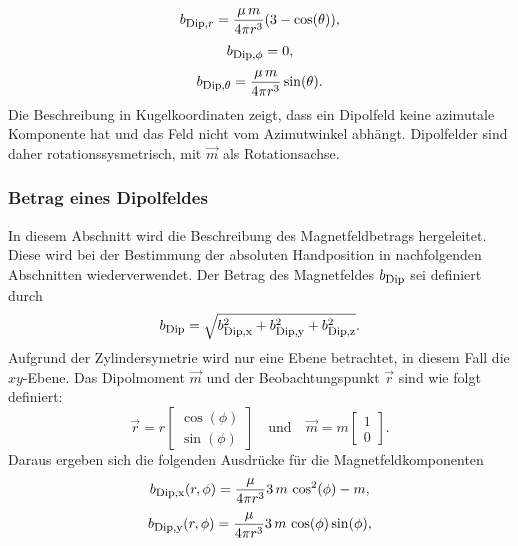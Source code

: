 \begin{equation}
    b_{\textrm{\footnotesize{Dip,$r$}}} = \frac{\mu\,m}{4 \pi r^3} (3-\cos(\theta)),
    \label{eq:radialeDip}
\end{equation}
\begin{equation}
    b_{\textrm{\footnotesize{Dip,$\phi$}}} = 0,
    \label{eq:phiDip}
\end{equation}
\begin{equation}
    b_{\textrm{\footnotesize{Dip,$\theta$}}} = \frac{\mu\,m}{4 \pi r^3} \sin(\theta).
\end{equation}
Die Beschreibung in Kugelkoordinaten zeigt, dass ein Dipolfeld keine azimutale Komponente hat und das Feld nicht vom Azimutwinkel abhängt. Dipolfelder sind daher rotationssysmetrisch, mit $\vec{m}$ als Rotationsachse.

\subsubsection{Betrag eines Dipolfeldes}
In diesem Abschnitt wird die Beschreibung des Magnetfeldbetrags hergeleitet. Diese wird bei der Bestimmung der absoluten Handposition in nachfolgenden Abschnitten wiederverwendet.
Der Betrag des Magnetfeldes $b_{\textrm{\footnotesize{Dip}}}$ sei definiert durch 
\begin{equation}
    b_{\textrm{\footnotesize{Dip}}} = \sqrt{b_{\textrm{\footnotesize{Dip,x}}}^2+b_{\textrm{\footnotesize{Dip,y}}}^2+b_{\textrm{\footnotesize{Dip,z}}}^2}.
    \label{eq:BetragBFeld}
\end{equation}
Aufgrund der Zylindersymetrie wird nur eine Ebene betrachtet, in diesem Fall die $xy$-Ebene. Das Dipolmoment $\vec{m}$ und der Beobachtungspunkt $\vec{r}$ sind wie folgt definiert:
\begin{equation}
    \vec{r} = r\left[\begin{array}{c} \cos(\phi)\\ \sin(\phi)\end{array}\right] \quad \textrm{und} \quad
    \vec{m} = m\left[\begin{array}{c} 1\\ 0 \end{array}\right].
    \label{eq:betragDefVeks}
\end{equation}
Daraus ergeben sich die folgenden Ausdrücke für die Magnetfeldkomponenten
\begin{equation}
    b_{\textrm{\footnotesize{Dip,x}}}(r,\phi) = \frac{\mu}{4\pi r^3} 3\,m\,\cos^2(\phi) - m,
\end{equation}
\begin{equation}
    b_{\textrm{\footnotesize{Dip,y}}}(r,\phi) = \frac{\mu}{4\pi r^3} 3\,m\,\cos(\phi) \sin(\phi),
\end{equation}

